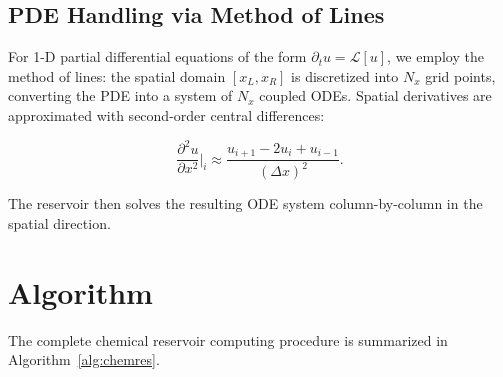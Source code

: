 \documentclass[11pt,twocolumn]{article}
\begin{document}
\subsection{PDE Handling via Method of Lines}
\label{sec:pde}

For 1-D partial differential equations of the form
$\partial_t u = \mathcal{L}[u]$, we employ the method of lines: the spatial
domain $[x_L, x_R]$ is discretized into $N_x$ grid points, converting the PDE
into a system of $N_x$ coupled ODEs.  Spatial derivatives are approximated
with second-order central differences:

\begin{equation}
  \frac{\partial^2 u}{\partial x^2}\bigg|_i \approx
    \frac{u_{i+1} - 2u_i + u_{i-1}}{(\Delta x)^2}.
\end{equation}

The reservoir then solves the resulting ODE system column-by-column in the
spatial direction.

\section{Algorithm}
\label{sec:algorithm}

The complete chemical reservoir computing procedure is summarized in
Algorithm~\ref{alg:chemres}.
\end{document}
